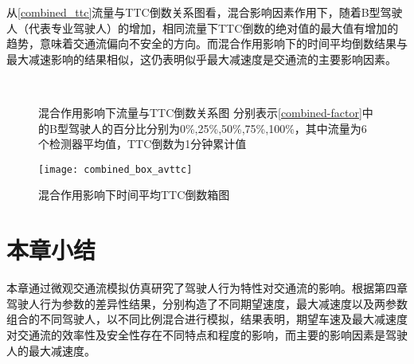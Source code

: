 从\autoref{combined_ttc}流量与TTC倒数关系图看，混合影响因素作用下，随着B型驾驶人（代表专业驾驶人）的增加，相同流量下TTC倒数的绝对值的最大值有增加的趋势，意味着交通流偏向不安全的方向。而混合作用影响下的时间平均倒数结果与最大减速影响的结果相似，这仍表明似乎最大减速度是交通流的主要影响因素。
\begin{figure}[htb]%
\centering
{}%
\\%
%
\caption[A set of four sub-floats.]{混合作用影响下流量与TTC倒数关系图
分别表示\autoref{combined-factor}中的B型驾驶人的百分比分别为0\%,25\%,50\%,75\%,100\%，其中流量为6个检测器平均值，TTC倒数为1分钟累计值}%
\label{combined_ttc}%
\end{figure}

\begin{figure}[htb]
\begin{center}
\texttt{[image: combined\_box\_avttc]}
\caption{混合作用影响下时间平均TTC倒数箱图}
\label{combined_box_avttc}
\end{center}
\end{figure}

\FloatBarrier

\section{本章小结}
本章通过微观交通流模拟仿真研究了驾驶人行为特性对交通流的影响。根据第四章驾驶人行为参数的差异性结果，分别构造了不同期望速度，最大减速度以及两参数组合的不同驾驶人，以不同比例混合进行模拟，结果表明，期望车速及最大减速度对交通流的效率性及安全性存在不同特点和程度的影响，而主要的影响因素是驾驶人的最大减速度。
